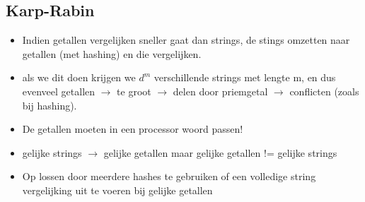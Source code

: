 \subsection{Karp-Rabin}
\begin{itemize}
\item Indien getallen vergelijken sneller gaat dan strings, de stings omzetten naar getallen (met hashing) en die vergelijken.
\item als we dit doen krijgen we $d^{m}$ verschillende strings met lengte m, en dus evenveel getallen $\rightarrow$ te groot $\rightarrow$ delen door priemgetal $\rightarrow$ conflicten (zoals bij hashing). 
\item De getallen moeten in een processor woord passen!
\item gelijke strings $\rightarrow$ gelijke getallen maar gelijke getallen != gelijke strings
\item Op lossen door meerdere hashes te gebruiken of een volledige string vergelijking uit te voeren bij gelijke getallen


\end{itemize}

